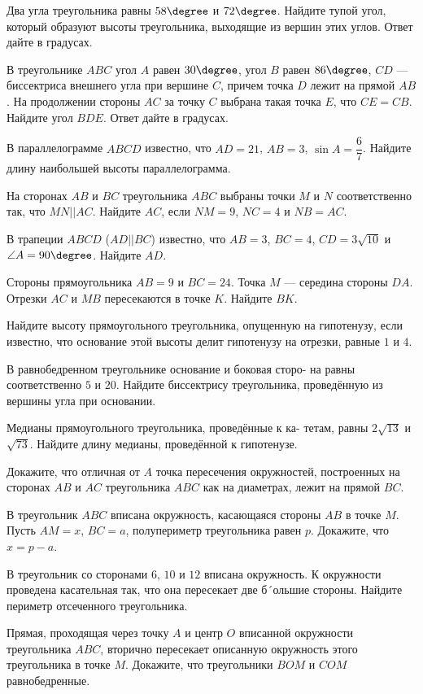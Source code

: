 \begin{class}[number=3]
	\begin{listofex}
		\item Два угла треугольника равны \( 58\degree \) и \( 72\degree \). Найдите тупой угол, который образуют высоты треугольника, выходящие из вершин этих углов. Ответ дайте в градусах.
		\item В треугольнике \( ABC \) угол \( A \) равен \( 30\degree \), угол \( B \) равен \( 86\degree \), \( CD \)  --- биссектриса внешнего угла при вершине \( C \), причем точка \( D \) лежит на прямой \( AB \). На продолжении стороны \( AC \) за точку \( C \) выбрана такая точка \( E \), что \( CE = CB \). Найдите угол \( BDE \). Ответ дайте в градусах.
		\item В параллелограмме \( ABCD \) известно, что \( AD = 21 \), \( AB = 3 \), \( \sin A = \dfrac{6}{7} \). Найдите длину наибольшей высоты параллелограмма.
		\item На сторонах \( AB \) и \( BC \) треугольника \( ABC \) выбраны точки \( M \) и \( N \) соответственно так, что \( MN||AC \). Найдите \( AC \), если \( NM =9 \), \( NC =4 \) и \( NB= AC \).
		\item В трапеции \( ABCD \) (\( AD || BC \)) известно, что \( AB=3 \), \( BC =4 \), \( CD=3\sqrt{10} \) и \( \angle A=90\degree \). Найдите \( AD \).
		\item Стороны прямоугольника \( AB=9 \) и \( BC =24 \). Точка \( M \) --- середина стороны \( DA \). Отрезки \( AC \) и \( MB \) пересекаются в точке \( K \). Найдите \( BK \).
		\item Найдите высоту прямоугольного треугольника, опущенную на
		гипотенузу, если известно, что основание этой высоты делит гипотенузу на отрезки, равные \( 1 \) и \( 4 \).
		\item В равнобедренном треугольнике основание и боковая сторо-
		на равны соответственно \( 5 \) и \( 20 \). Найдите биссектрису треугольника, проведённую из вершины угла при основании.
		\item Медианы прямоугольного треугольника, проведённые к ка-
		тетам, равны \( 2\sqrt{13} \) и\( \sqrt{73} \). Найдите длину медианы, проведённой к гипотенузе.
		\item Докажите, что отличная от \( A \) точка пересечения окружностей, построенных на сторонах \( AB \) и \( AC \) треугольника \( ABC \) как на диаметрах, лежит на прямой \( BC \).
		\item В треугольник \( ABC \) вписана окружность, касающаяся стороны \( AB \) в точке \( M \). Пусть \( AM = x \), \( BC = a \), полупериметр треугольника равен \( p \). Докажите, что \( x = p - a \).
		\item В треугольник со сторонами \( 6 \), \( 10 \) и \( 12 \) вписана окружность. К окружности проведена касательная так, что
		она пересекает две б´ольшие стороны. Найдите периметр отсеченного треугольника.
		\item Прямая, проходящая через точку \( A \) и центр \( O \) вписанной окружности треугольника \( ABC \), вторично пересекает
		описанную окружность этого треугольника в точке \( M \). Докажите, что треугольники \( BOM \) и \( COM \) равнобедренные.
	\end{listofex}
\end{class}
